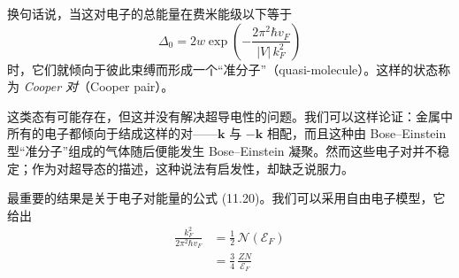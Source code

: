 换句话说，当这对电子的总能量在费米能级以下等于
\begin{equation*}
\Delta_{0}=2w\exp\left(-\frac{2\pi^{2}\hbar v_{F}}{|V|\,k_{F}^{2}}\right)
\tag{11.20}
\end{equation*}
时，它们就倾向于彼此束缚而形成一个“准分子”（quasi-molecule）。这样的状态称为 \emph{Cooper 对}（Cooper pair）。

这类态有可能存在，但这并没有解决超导电性的问题。我们可以这样论证：金属中所有的电子都倾向于结成这样的对——$\mathbf{k}$ 与 $-\mathbf{k}$ 相配，而且这种由 Bose–Einstein 型“准分子”组成的气体随后便能发生 Bose–Einstein 凝聚。然而这些电子对并不稳定；作为对超导态的描述，这种说法有启发性，却缺乏说服力。

最重要的结果是关于电子对能量的公式 (11.20)。我们可以采用自由电子模型，它给出
\begin{align*}
\frac{k_{F}^{2}}{2\pi^{2}\hbar v_{F}} &= \frac{1}{2}\,\mathcal{N}(\mathcal{E}_{F})\\
&= \frac{3}{4}\,\frac{ZN}{\mathcal{E}_{F}}
\tag{11.21}
\end{align*}
